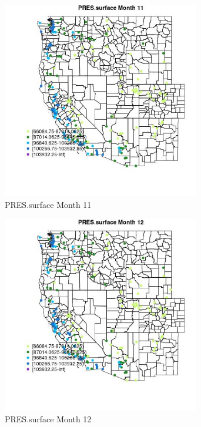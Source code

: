 \begin{figure} 
\centering  
\includegraphics[width=0.77\textwidth]{Code_Outputs/Report_ML_input_PM25_Step4_part_e_de_duplicated_aveswNAs_MapObsMo11PRESsurface.jpg} 
\caption{\label{fig:Report_ML_input_PM25_Step4_part_e_de_duplicated_aveswNAsMapObsMo11PRESsurface}PRES.surface Month 11} 
\end{figure} 
 

\begin{figure} 
\centering  
\includegraphics[width=0.77\textwidth]{Code_Outputs/Report_ML_input_PM25_Step4_part_e_de_duplicated_aveswNAs_MapObsMo12PRESsurface.jpg} 
\caption{\label{fig:Report_ML_input_PM25_Step4_part_e_de_duplicated_aveswNAsMapObsMo12PRESsurface}PRES.surface Month 12} 
\end{figure} 
 

